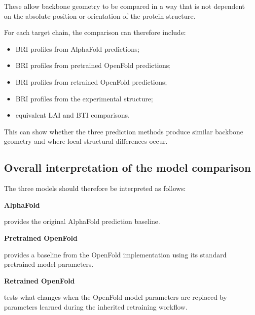 \documentclass[11pt,a4paper]{article}
\begin{document}
These allow backbone geometry to be compared in a way that is not dependent on the absolute position or orientation of the protein structure.

For each target chain, the comparison can therefore include:

\begin{itemize}[leftmargin=*]

    \item BRI profiles from AlphaFold predictions;

    \item BRI profiles from pretrained OpenFold predictions;

    \item BRI profiles from retrained OpenFold predictions;

    \item BRI profiles from the experimental structure;

    \item equivalent LAI and BTI comparisons.

\end{itemize}

This can show whether the three prediction methods produce similar backbone geometry and where local structural differences occur.


\subsection{Overall interpretation of the model comparison}

The three models should therefore be interpreted as follows:

\begin{center}
\textbf{AlphaFold}
\end{center}

provides the original AlphaFold prediction baseline.

\begin{center}
\textbf{Pretrained OpenFold}
\end{center}

provides a baseline from the OpenFold implementation using its standard pretrained model parameters.

\begin{center}
\textbf{Retrained OpenFold}
\end{center}

tests what changes when the OpenFold model parameters are replaced by parameters learned during the inherited retraining workflow.
\end{document}
